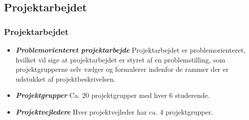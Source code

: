 \documentclass[t, aspectratio=169]{beamer}
\newcommand{\textdesc}[1]{\textit{\textbf{#1}}}
\newcommand{\descitem}[1]{\item \textdesc{#1}}
\begin{document}
\subsection{Projektarbejdet}
\begin{frame}[fragile]
  \frametitle{Projektarbejdet}
  
  \vspace{7mm}
  \begin{itemize}
    \setlength\itemsep{7mm}
    \descitem{Problemorienteret projektarbejde} Projektarbejdet er problemorienteret, hvilket vil sige at projektarbejdet er styret af en problemstilling, som projektgrupperne selv vælger og formulerer indenfor de rammer der er udstukket af projektbeskrivelsen.
    \descitem{Projektgrupper} Ca. 20 projektgrupper med hver 6 studerende.
    \descitem{Projektvejledere} Hver projektvejleder har ca. 4 projektgrupper.
  \end{itemize}
\end{frame}
\end{document}
